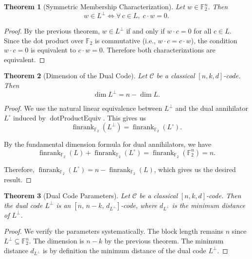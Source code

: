 \documentclass[11pt]{article}
\theoremstyle{plain}
\newtheorem*{theorem}{Theorem}
\theoremstyle{definition}
\theoremstyle{remark}
\begin{document}
\begin{theorem}[Symmetric Membership Characterization]
Let $w \in \mathbb{F}_2^n$. Then
\[
w \in L^\perp \iff \forall\, c \in L,\; c \cdot w = 0.
\]
\end{theorem}

\begin{proof}
By the previous theorem, $w \in L^\perp$ if and only if $w \cdot c = 0$ for all $c \in L$. Since the dot product over $\mathbb{F}_2$ is commutative (i.e., $w \cdot c = c \cdot w$), the condition $w \cdot c = 0$ is equivalent to $c \cdot w = 0$. Therefore both characterizations are equivalent.
\end{proof}

\begin{theorem}[Dimension of the Dual Code]
Let $\mathcal{C}$ be a classical $[n,k,d]$-code. Then
\[
\dim L^\perp = n - \dim L.
\]
\end{theorem}

\begin{proof}
We use the natural linear equivalence between $L^\perp$ and the dual annihilator $L^{\circ}$ induced by $\operatorname{dotProductEquiv}$. This gives us
\[
\operatorname{finrank}_{\mathbb{F}_2}(L^\perp) = \operatorname{finrank}_{\mathbb{F}_2}(L^{\circ}).
\]

By the fundamental dimension formula for dual annihilators, we have
\[
\operatorname{finrank}_{\mathbb{F}_2}(L) + \operatorname{finrank}_{\mathbb{F}_2}(L^{\circ}) = \operatorname{finrank}_{\mathbb{F}_2}(\mathbb{F}_2^n) = n.
\]

Therefore, $\operatorname{finrank}_{\mathbb{F}_2}(L^{\circ}) = n - \operatorname{finrank}_{\mathbb{F}_2}(L)$, which gives us the desired result.
\end{proof}

\begin{theorem}[Dual Code Parameters]
Let $\mathcal{C}$ be a classical $[n,k,d]$-code. Then the dual code $L^\perp$ is an $[n,\, n-k,\, d_{L^\perp}]$-code, where $d_{L^\perp}$ is the minimum distance of $L^\perp$.
\end{theorem}

\begin{proof}
We verify the parameters systematically. The block length remains $n$ since $L^\perp \subseteq \mathbb{F}_2^n$. The dimension is $n-k$ by the previous theorem. The minimum distance $d_{L^\perp}$ is by definition the minimum distance of the dual code $L^\perp$.
\end{proof}
\end{document}
